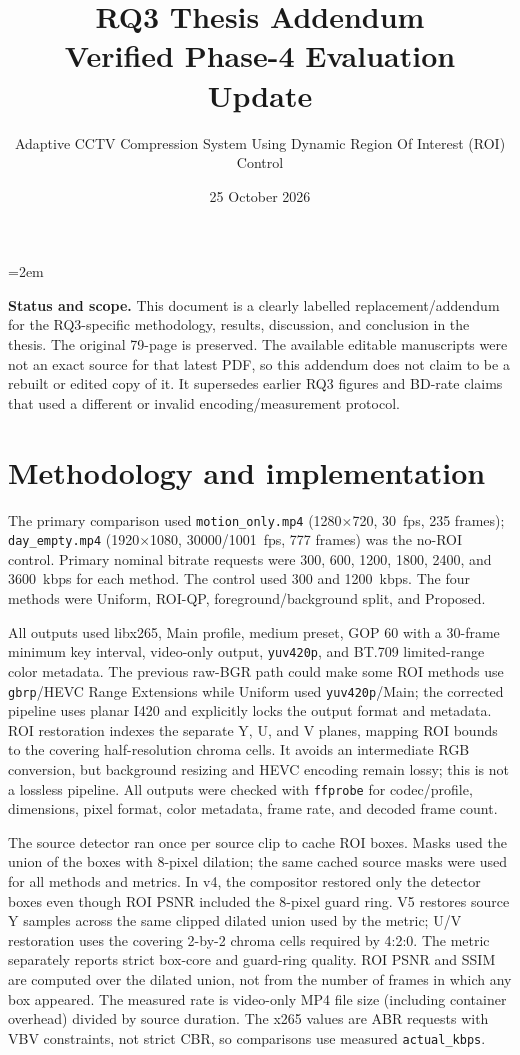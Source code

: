 \documentclass[11pt,a4paper]{article}
\title{RQ3 Thesis Addendum\\\large Verified Phase-4 Evaluation Update}
\author{Adaptive CCTV Compression System Using Dynamic Region Of Interest (ROI) Control}
\date{25 October 2026}
\begin{document}
\maketitle

\emergencystretch=2em

\noindent\textbf{Status and scope.}
This document is a clearly labelled replacement/addendum for the RQ3-specific
methodology, results, discussion, and conclusion in the thesis. The original
79-page  is preserved. The available
editable manuscripts were not an exact source for that latest PDF, so this
addendum does not claim to be a rebuilt or edited copy of it. It supersedes
earlier RQ3 figures and BD-rate claims that used a different or invalid
encoding/measurement protocol.

\section{Methodology and implementation}

The primary comparison used \texttt{motion\_only.mp4} (1280$\times$720,
30~fps, 235 frames); \texttt{day\_empty.mp4} (1920$\times$1080,
30000/1001~fps, 777 frames) was the no-ROI control. Primary nominal
bitrate requests were 300, 600, 1200, 1800, 2400, and 3600~kbps for each
method. The control used 300 and 1200~kbps. The four methods were Uniform,
ROI-QP, foreground/background split, and Proposed.

All outputs used libx265, Main profile, medium preset, GOP 60 with a
30-frame minimum key interval, video-only output, \texttt{yuv420p}, and
BT.709 limited-range color metadata. The previous raw-BGR path could make
some ROI methods use \texttt{gbrp}/HEVC Range Extensions while Uniform used
\texttt{yuv420p}/Main; the corrected pipeline uses planar I420 and explicitly
locks the output format and metadata. ROI restoration indexes the separate
Y, U, and V planes, mapping ROI bounds to the covering half-resolution
chroma cells. It avoids an intermediate RGB conversion, but background
resizing and HEVC encoding remain lossy; this is not a lossless pipeline.
All outputs were checked with \texttt{ffprobe} for codec/profile, dimensions,
pixel format, color metadata, frame rate, and decoded frame count.

The source detector ran once per source clip to cache ROI boxes. Masks used
the union of the boxes with 8-pixel dilation; the same cached source masks
were used for all methods and metrics. In v4, the compositor restored only
the detector boxes even though ROI PSNR included the 8-pixel guard ring.
V5 restores source Y samples across the same clipped dilated union used by
the metric; U/V restoration uses the covering 2-by-2 chroma cells required
by 4:2:0. The metric separately reports strict box-core and guard-ring
quality. ROI PSNR and SSIM are computed over the dilated union, not from
the number of frames in which any box appeared. The measured rate is
video-only MP4 file size (including container overhead) divided by source
duration. The x265 values are ABR requests with VBV constraints, not strict
CBR, so comparisons use measured \texttt{actual\_kbps}.
\end{document}
